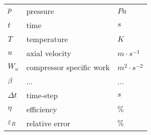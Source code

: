 \begin{tabular}{lll}
$p$ & pressure & $Pa$ \\
$t$ & time & $s$ \\
$T$ & temperature & $K$ \\
$u$ & axial velocity & $m \cdot s^{-1}$ \\
$W_u$ & compressor specific work & $m^{2} \cdot s^{-2}$ \\
$\beta$ & ... & ...\\
$\Delta t$& time-step & $s$ \\
$\eta$& efficiency & $\%$ \\
$\varepsilon_R$ & relative error & $\%$ \\

\end{tabular}
